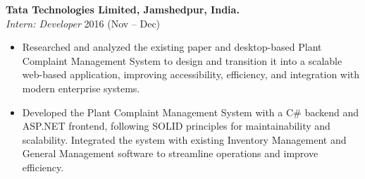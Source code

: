 \textbf{Tata Technologies Limited, Jamshedpur, India.} \\
\textit{Intern: Developer} \hfill 2016 (Nov – Dec)
\begin{itemize}[noitemsep,nolistsep]
    \item Researched and analyzed the existing paper and desktop-based Plant Complaint Management System to design and transition it into a scalable web-based application, improving accessibility, efficiency, and integration with modern enterprise systems.
    \item Developed the Plant Complaint Management System with a C\# backend and ASP.NET frontend, following SOLID principles for maintainability and scalability. Integrated the system with existing Inventory Management and General Management software to streamline operations and improve efficiency.
\end{itemize}
